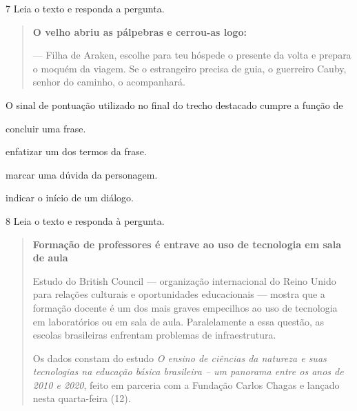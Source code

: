 \num{7} Leia o texto e responda a pergunta.

\begin{quote}
\textbf{O velho abriu as pálpebras e cerrou-as logo:}

--- Filha de Araken, escolhe para teu hóspede o presente da volta e
prepara o moquém da viagem. Se o estrangeiro precisa de guia, o
guerreiro Cauby, senhor do caminho, o acompanhará.
\end{quote}


O sinal de pontuação utilizado no final do trecho destacado cumpre a
função de

\begin{escolha}
  \item concluir uma frase.

  \item enfatizar um dos termos da frase.

  \item marcar uma dúvida da personagem.

  \item indicar o início de um diálogo.
\end{escolha}

\num{8} Leia o texto e responda à pergunta.

\begin{quote}
\textbf{Formação de professores é entrave ao uso de tecnologia em sala de
aula}

Estudo do British Council --- organização internacional do Reino Unido
para relações culturais e oportunidades educacionais --- mostra que a
formação docente é um dos mais graves empecilhos ao uso de tecnologia em
laboratórios ou em sala de aula. Paralelamente a essa questão, as
escolas brasileiras enfrentam problemas de infraestrutura.

Os dados constam do estudo \textit{O ensino de ciências da natureza e suas
tecnologias na educação básica brasileira -- um panorama entre os anos
de 2010 e 2020}, feito em parceria com a Fundação Carlos Chagas e lançado
nesta quarta-feira (12).
\end{quote}


